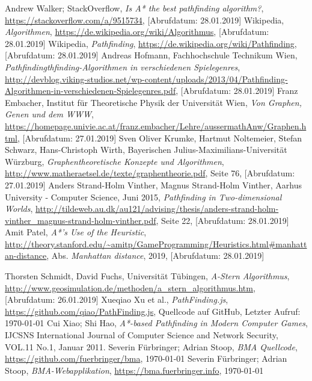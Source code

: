 \begin{thebibliography}{9}
  Andrew Walker; StackOverflow,
  \textit{Is A* the best pathfinding algorithm?},
  \url{https://stackoverflow.com/a/9515734},
  [Abrufdatum: 28.01.2019]
  Wikipedia,
  \textit{Algorithmen},
  \url{https://de.wikipedia.org/wiki/Algorithmus},
  [Abrufdatum: 28.01.2019]
  Wikipedia,
  \textit{Pathfinding},
  \url{https://de.wikipedia.org/wiki/Pathfinding},
  [Abrufdatum: 28.01.2019]
  Andreas Hofmann, Fachhochschule Technikum Wien,
  \textit{Pathfindingthfinding-Algorithmen in verschiedenen Spielegenres},
  \url{http://devblog.viking-studios.net/wp-content/uploads/2013/04/Pathfinding-Algorithmen-in-verschiedenen-Spielegenres.pdf},
  [Abrufdatum: 28.01.2019]
  Franz Embacher, Institut für Theoretische Physik der Universität Wien,
  \textit{Von Graphen, Genen und dem WWW},
  \url{https://homepage.univie.ac.at/franz.embacher/Lehre/aussermathAnw/Graphen.html},
  [Abrufdatum: 27.01.2019]
  Sven Oliver Krumke, Hartmut Noltemeier, Stefan Schwarz, Hans-Christoph Wirth,
  Bayerischen Julius-Maximilians-Universität Würzburg,
  \textit{Graphentheoretische Konzepte und Algorithmen},
  \url{http://www.matheraetsel.de/texte/graphentheorie.pdf},
  Seite 76,
  [Abrufdatum: 27.01.2019]
  Anders Strand-Holm Vinther, Magnus Strand-Holm Vinther, Aarhus University - Computer Science, Juni 2015,
  \textit{Pathfinding in Two-dimensional Worlds},
  \url{http://tildeweb.au.dk/au121/advising/thesis/anders-strand-holm-vinther\_magnus-strand-holm-vinther.pdf},
  Seite 22,
  [Abrufdatum: 28.01.2019]
  Amit Patel,
  \textit{A*'s Use of the Heuristic},
  \url{http://theory.stanford.edu/~amitp/GameProgramming/Heuristics.html\#manhattan-distance},
  Abs. \textit{Manhattan distance},
  2019, 
  [Abrufdatum: 28.01.2019]

  Thorsten Schmidt, David Fuchs, Universität Tübingen,
  \textit{A-Stern Algorithmus},
  \url{http://www.geosimulation.de/methoden/a\_stern\_algorithmus.htm},
  [Abrufdatum: 26.01.2019]
  Xueqiao Xu et al.,
  \textit{PathFinding.js},
  \url{https://github.com/qiao/PathFinding.js},
  Quellcode auf GitHub,
  Letzter Aufruf: \today
{}
  Cui Xiao; Shi Hao,
  \textit{A*-based Pathfinding in Modern Computer Games},
  IJCSNS International Journal of Computer Science and Network Security, VOL.11 No.1,
  Januar 2011.
  Severin Fürbringer; Adrian Stoop,
  \textit{BMA Quellcode},
  \url{https://github.com/fuerbringer/bma},
  \today
{}
  Severin Fürbringer; Adrian Stoop,
  \textit{BMA-Webapplikation},
  \url{https://bma.fuerbringer.info},
  \today
\end{thebibliography}
